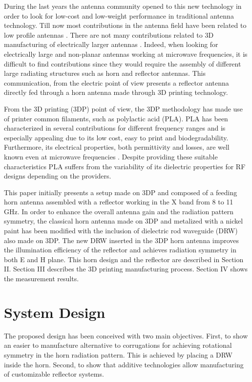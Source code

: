 \documentclass{IEEEtran}
\begin{document}
During the last years the antenna community opened to this new technology in order to look for low-cost and low-weight performance in traditional antenna technology. Till now most contributions in the antenna field have been related to low profile antennas \cite{ref:LowProfileAntennas1, ref:LowProfileAntennas2,ref:LowProfileAntennas3}. There are not many contributions related to 3D manufacturing of electrically larger antennas \cite{ref:ElectricallyLargeAntennas1,ref:ElectricallyLargeAntennas2}. Indeed, when looking for electrically large and non-planar antennas working at microwave frequencies, it is difficult to find contributions since they would require the assembly of different large radiating structures such as horn and reflector antennas. This communication, from the electric point of view presents a reflector antenna directly fed through a horn antenna made through 3D printing technology. 

From the 3D printing (3DP) point of view, the 3DP methodology has made use of printer common filaments, such as polylactic acid (PLA). PLA has been characterized in several contributions \cite{ref:PLA1,ref:PLA2} for different frequency ranges and is especially appealing due to its low cost, easy to print and biodegradability. Furthermore, its electrical properties, both permittivity and losses, are well known even at microwave frequencies \cite{ref:PLA1,ref:PLA2}. Despite providing these suitable characteristics PLA suffers from the variability of its dielectric properties for RF designs \cite{ref:MCAllister1983, ref:Petosa1998, ref:Yeh2008} depending on the providers. 

This paper initially presents a setup made on 3DP and composed of a feeding horn antenna assembled with a reflector working in the X band from 8 to 11 GHz. In order to enhance the overall antenna gain and the radiation pattern symmetry, the classical horn antenna made on 3DP and metalized with a nickel paint has been modified with the inclusion of dielectric rod waveguide (DRW) also made on 3DP. The new DRW inserted in the 3DP horn antenna improves the illumination efficiency of the reflector and achieves radiation symmetry in both E and H plane. This horn design and the reflector are described in Section II. Section III describes the 3D printing manufacturing process. Section IV shows the measurement results. 

\section{System Design}
The proposed design has been conceived with two main objectives. First, to show an easier to manufacture alternative to corrugations for achieving rotational symmetry in the horn radiation pattern. This is achieved by placing a DRW inside the horn. Second, to show that additive technologies allow manufacturing of customizable reflector systems. 
\end{document}
